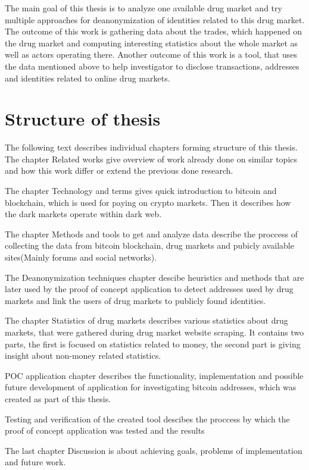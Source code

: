 \documentclass[
  digital, %
  table,   %
  lof,     %
  lot,     %
  oneside
]{fithesis3}
\begin{document}
The main goal of this thesis is to analyze one available drug market 
and try multiple approaches for deanonymization of identities related to this drug market.
The outcome of this work is gathering data about the trades, which happened on the drug market and
 computing interesting statistics about the whole market as well as actors operating there.
Another outcome of this work is a tool, that uses the data mentioned above to help investigator to disclose transactions,
addresses and identities related to online drug markets.

\section{Structure of thesis}

The following text describes individual chapters forming structure of this thesis.
The chapter Related works give overview of work already done on similar topics and 
how this work differ or extend the previous done research.

The chapter Technology and terms gives quick introduction to bitcoin and blockchain, which is used for paying on crypto markets.
Then it describes how the dark markets operate within dark web.

The chapter Methods and tools to get and analyze data describe the proccess of collecting the data from bitcoin blockchain,
drug markets and pubicly available sites(Mainly forums and social networks). 

The Deanonymization techniques chapter descibe heuristics and methods that are later used by the proof of concept application to detect 
addresses used by drug markets and link the users of drug markets to publicly found identities.

The chapter Statistics of drug markets describes various statistics about drug markets, that were gathered during drug market website scraping.
It contains two parts, the first is focused on statistics related to money, the second part is giving insight about non-money related statistics.

POC application chapter describes the functionality, implementation and 
possible future development of application for investigating bitcoin addresses, which was created as part of this thesis.

Testing and verification of the created tool descibes the proccess by which the proof of concept application was tested and the results

The last chapter Discussion is about achieving goals, problems of implementation and future work.
\end{document}

